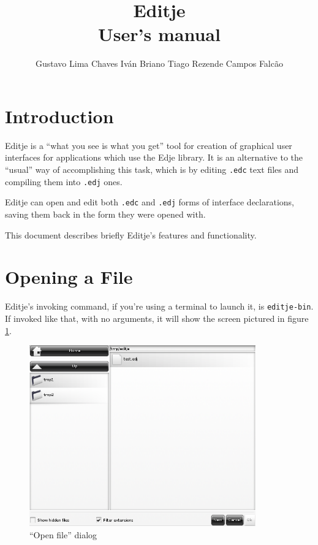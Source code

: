\documentclass[a4paper]{profusion}
\title{Editje\\
  \normalsize{User's manual}}
\author{Gustavo Lima Chaves \hspace{1cm} Iván Briano \hspace{1cm}
  Tiago Rezende Campos Falcão}
\begin{document}
\maketitle
\tableofcontents
\listoffigures

\section{Introduction}

Editje is a ``what you see is what you get'' tool for creation of
graphical user interfaces for applications which use the Edje
library. It is an alternative to the ``usual'' way of accomplishing
this task, which is by editing \texttt{.edc} text files and compiling
them into \texttt{.edj} ones.

Editje can open and edit both \texttt{.edc} and \texttt{.edj} forms of
interface declarations, saving them back in the form they were opened
with.

This document describes briefly Editje's features and functionality.

\section{Opening a File}

Editje's invoking command, if you're using a terminal to launch it, is
\texttt{editje-bin}. If invoked like that, with no arguments, it will
show the screen pictured in figure \ref{fig:open_file}.

\begin{figure}[h!]
  \centering
  \includegraphics[width=0.87\textwidth]{images/open_file.png}
  \caption{``Open file'' dialog}
  \label{fig:open_file}
\end{figure}
\end{document}
